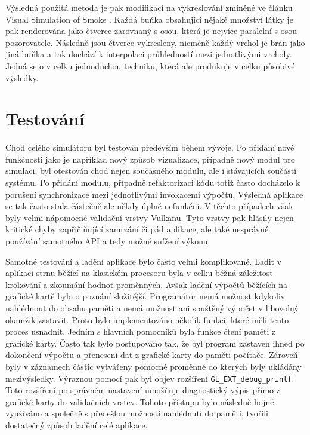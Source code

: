 Výsledná použitá metoda je pak modifikací na vykreslování zmíněné ve článku Visual Simulation of Smoke \cite{visualSmoke}. Každá buňka obsahující nějaké množství látky je pak renderována jako čtverec zarovnaný s osou, která je nejvíce paralelní s osou pozorovatele. Následně jsou čtverce vykresleny, nicméně každý vrchol je brán jako jiná buňka a tak dochází k interpolaci průhledností mezi jednotlivými vrcholy. Jedná se o v celku jednoduchou techniku, která ale produkuje v celku působivé výsledky.

\chapter{Testování}
\label{chapter:testovani}
Chod celého simulátoru byl testován především během vývoje. Po přidání nové funkčnosti jako je například nový způsob vizualizace, případně nový modul pro simulaci, byl otestován chod nejen současného modulu, ale i stávajících součástí systému. Po přidání modulu, případně refaktorizaci kódu totiž často docházelo k porušení synchronizace mezi jednotlivými invokacemi výpočtů. Výsledná aplikace se tak často stala částečně ale někdy úplně nefunkční. V těchto případech však byly velmi nápomocné validační vrstvy Vulkanu. Tyto vrstvy pak hlásily nejen kritické chyby zapřičiňující zamrzání či pád aplikace, ale také nesprávné používání samotného API a tedy možné snížení výkonu.

Samotné testování a ladění aplikace bylo často velmi komplikované. Ladit v aplikaci strnu běžící na klasickém procesoru byla v celku běžná záležitost krokování a zkoumání hodnot proměnných. Avšak ladění výpočtů běžících na grafické kartě bylo o poznání složitější. Programátor nemá možnost kdykoliv nahlédnout do obsahu paměti a nemá možnost ani spuštěný výpočet v libovolný okamžik zastavit. Proto bylo implementováno několik funkcí, které měli tento proces usnadnit. Jedním s hlavních pomocníků byla funkce čtení paměti z grafické karty. Často tak bylo postupováno tak, že byl program zastaven ihned po dokončení výpočtu a přenesení dat z grafické karty do paměti počítače. Zároveň byly v záznamech částic vytvářeny pomocné proměnné do kterých byly ukládány mezivýsledky. Výraznou pomocí pak byl objev rozšíření \texttt{GL\_EXT\_debug\_printf}. Toto rozšíření po správném nastavení umožňuje diagnostický výpis přímo z grafické karty do validačních vrstev. Tohoto přístupu bylo následně hojně využíváno a společně s předešlou možností nahlédnutí do paměti, tvořili dostatečný způsob ladění celé aplikace.

